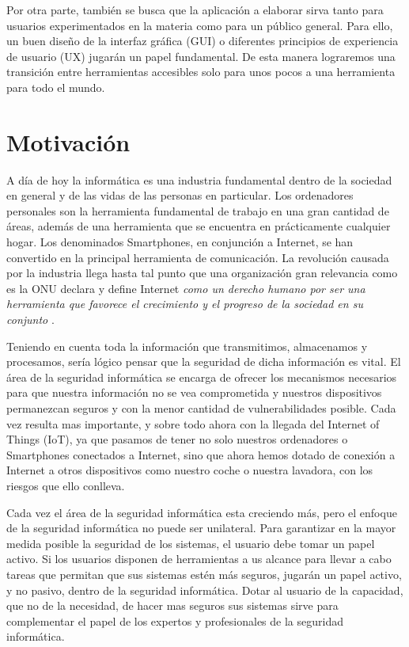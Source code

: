 Por otra parte, también se busca que la aplicación a elaborar sirva tanto para usuarios experimentados en la materia como para un público general. Para ello, un buen diseño de la interfaz gráfica (GUI) o diferentes principios de experiencia de usuario (UX) jugarán un papel fundamental. De esta manera lograremos una transición entre herramientas accesibles solo para unos pocos a una herramienta para todo el mundo.

\section{Motivación}

A día de hoy la informática es una industria fundamental dentro de la sociedad en general y de las vidas de las personas en particular. Los ordenadores personales son la herramienta fundamental de trabajo en una gran cantidad de áreas, además de una herramienta que se encuentra en prácticamente cualquier hogar. Los denominados Smartphones, en conjunción a Internet, se han convertido en la principal herramienta de comunicación. La revolución causada por la industria llega hasta tal punto que una organización gran relevancia como es la ONU declara y define Internet \textit{como un derecho humano por ser una herramienta que favorece el crecimiento y el progreso de la sociedad en su conjunto} \cite{onu-internet}.

Teniendo en cuenta toda la información que transmitimos, almacenamos y procesamos, sería lógico pensar que la seguridad de dicha información es vital. El área de la seguridad informática se encarga de ofrecer los mecanismos necesarios para que nuestra información no se vea comprometida y nuestros dispositivos permanezcan seguros y con la menor cantidad de vulnerabilidades posible. Cada vez resulta mas importante, y sobre todo ahora con la llegada del Internet of Things (IoT), ya que pasamos de tener no solo nuestros ordenadores o Smartphones conectados a Internet, sino que ahora hemos dotado de conexión a Internet a otros dispositivos como nuestro coche o nuestra lavadora, con los riesgos que ello conlleva.

Cada vez el área de la seguridad informática esta creciendo más, pero el enfoque de la seguridad informática no puede ser unilateral. Para garantizar en la mayor medida posible la seguridad de los sistemas, el usuario debe tomar un papel activo. Si los usuarios disponen de herramientas a us alcance para llevar a cabo tareas que permitan que sus sistemas estén más seguros, jugarán un papel activo, y no pasivo, dentro de la seguridad informática. Dotar al usuario de la capacidad, que no de la necesidad, de hacer mas seguros sus sistemas sirve para complementar el papel de los expertos y profesionales de la seguridad informática.